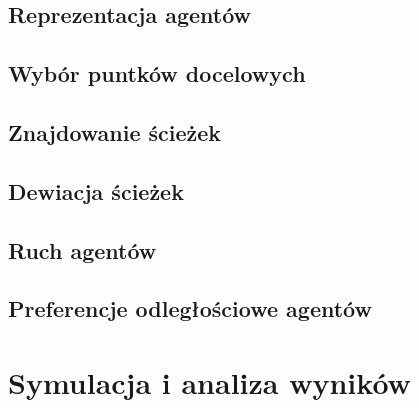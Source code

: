 \documentclass[a4paper, 12pt]{article}
\begin{document}
        \subsection{Reprezentacja agentów}
        \label{sec:actor-impl}


        \subsection{Wybór puntków docelowych}
        \label{sec:destination-choice}


        \subsection{Znajdowanie ścieżek}
        \label{sec:path-finding}


        \subsection{Dewiacja ścieżek}
        \label{sec:path-deviation}


        \subsection{Ruch agentów}
        \label{sec:movement-impl}


        \subsection{Preferencje odległościowe agentów}
        \label{sec:social-dist}


\newpage
    \section{Symulacja i analiza wyników}
    \label{sec:sim}

\end{document}
